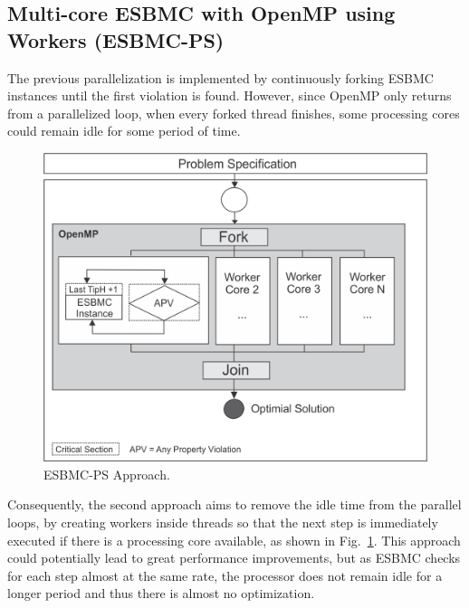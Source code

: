 \subsection{Multi-core ESBMC with OpenMP using Workers (ESBMC-PS)}
\label{Multi-core-ESBMC-with-OpenMP-using-workers}

The previous parallelization is implemented by continuously forking ESBMC instances until the first violation is found. However, since OpenMP only returns from a parallelized loop, when every forked thread finishes, some processing cores could remain idle for some period of time.

\begin{figure}[ht]
	\centering
  \includegraphics[scale=0.75]{Image/esbmc-parallel.png} 
	\caption{ESBMC-PS Approach. }
	\label{ESBMC-Multi-core-Optimized-Sequential-Approach}
\end{figure}

Consequently, the second approach aims to remove the idle time from the parallel loops, by creating workers inside threads so that the next step is immediately executed if there is a processing core available, as shown in Fig.~\ref{ESBMC-Multi-core-Optimized-Sequential-Approach}. This approach could potentially lead to great performance improvements, but as ESBMC checks for each step almost at the same rate, the processor does not remain idle for a longer period and thus there is almost no optimization.

